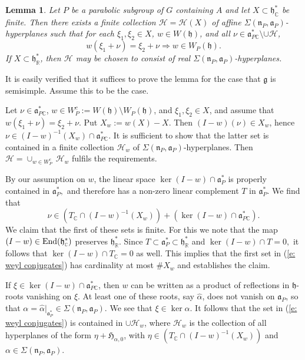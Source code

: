 \documentclass[12pt,a4paper]{article}
\newtheorem{Lemma}[Thm]{Lemma}
\newenvironment{lemma}[0]{\begin{Lemma}\noindent}%
{\end{Lemma}}
\def\proof{\par\noindent{\it Proof.}{\ }{\ }}
\def\msy#1{{\mathbb #1}}
\def\C{{\msy C}}
\def\R{{\msy R}}
\def\ga{\alpha}
\def\gS{\Sigma}
\def\got#1{\mathfrak #1}
\def\fa{{\got a}}
\def\fg{{\got g}}
\def\fh{{\got h}}
\def\fn{{\got n}}
\def\implies{\Rightarrow}
\def\End{{\rm End}}
\def\implies{\Leftarrow}
\def\iC{{\scriptscriptstyle \C}}
\def\cH{{\mathcal H}}
\numberwithin{Thm}{section}
\numberwithin{equation}{section}
\def\implies{\Rightarrow}
\def\faPdc{{\fa_{P\iC}^*}}
\def\faPd{{\fa_P^*}}
\def\fhdc{\fh_\iC^*}
\numberwithin{equation}{section}
\def\fhdc{\fh_\iC^*}
\def\faPdc{\fa_{P\iC}^*}
\def\fh{{\mathfrak h}}
\def\bfhyp{hyperplanes}
\def\hypp{{\mathfrak H}}
\begin{document}
\begin{lemma}
\label{l: generic W h conjugacy}
Let $P$ be a parabolic subgroup of $G$ containing $A$ and let $X \subset \fhdc$ be finite. 
Then there exists a finite collection $\cH= \cH(X)$ of affine $\gS(\fn_P, \fa_P)$-{\bfhyp} 
such that for each $\xi_1, \xi_2 \in X$,  $w \in W(\fh)$, and all $\nu\in \faPdc\setminus \cup \cH$,
$$ 
w(\xi_1+ \nu) = \xi_2  + \nu \implies w \in W_P(\fh).
$$ 
If $X \subset \fh_\R^*$, then $\cH$ may be chosen to consist of real $\gS(\fn_P, \fa_P)$-{\bfhyp}.
\end{lemma}

\proof 
It is easily verified that it suffices to prove the lemma for the case that $\fg$ is semisimple.
Assume this to be the case.

Let $\nu \in \faPdc$, $w \in W_P^c := W(\fh)\setminus W_P(\fh)$, and $\xi_1, \xi_2 \in X$, and assume that 
$w(\xi_1 + \nu) = \xi_2 + \nu.$  Put $X_w:= w(X) - X.$ Then $(I- w)(\nu) \in X_w$, 
hence $\nu \in (I-w)^{-1}(X_w) \cap \faPdc.$ It is sufficient to show that the latter set is contained in 
a finite collection $\cH_w$ of $\gS(\fn_P, \fa_P)$-{\bfhyp}. Then $\cH = \cup_{w \in W_P^c} \,\cH_w$ fulfils the requirements.

By our assumption on $w$, the linear space $\ker (I-w) \cap \faPd$ is properly contained in $\faPd, $
and therefore has a non-zero linear complement $T$ in $\faPd.$ We find that
\begin{equation}
\label{e: weyl conjugates} 
\nu \in  (T_\iC \cap (I- w)^{-1}(X_w)) +  (\ker (I-w) \cap \faPdc).
\end{equation}
We claim that the first of these sets is finite.
For this we note that the map $(I-w) \in \End(\fhdc)$  preserves $\fh^*_\R.$ 
Since $T\subset \faPd\subset \fh^*_\R$ and $\ker (I -w)\cap T = 0,$ it follows that 
$\ker (I-w) \cap T_\C = 0$ as well. This implies that the first set in (\ref{e: weyl conjugates})
has cardinality at  most $\# X_w$ and establishes the claim.

If $\xi \in \ker (I- w) \cap \faPdc$, then $w$ can be written 
as a product of reflections in $\fh$-roots vanishing on $\xi.$ 
At least one of these roots, say $\widehat \ga$, 
does not vanish on $\fa_P$, so that $\ga = \widehat\ga|_{\faPd} \in \gS(\fn_P, \fa_P).$ 
We see that $\xi \in \ker \ga.$ It follows that the set in (\ref{e: weyl conjugates}) is contained in $\cup \cH_w$, 
where $\cH_w$ is the collection of all {\bfhyp} of the form $\eta + \hypp_{\ga, 0}$, with $\eta \in (T_\iC \cap (I-w)^{-1}(X_w))$ 
and $\ga \in \gS(\fn_P, \fa_P).$ 
\end{document}
